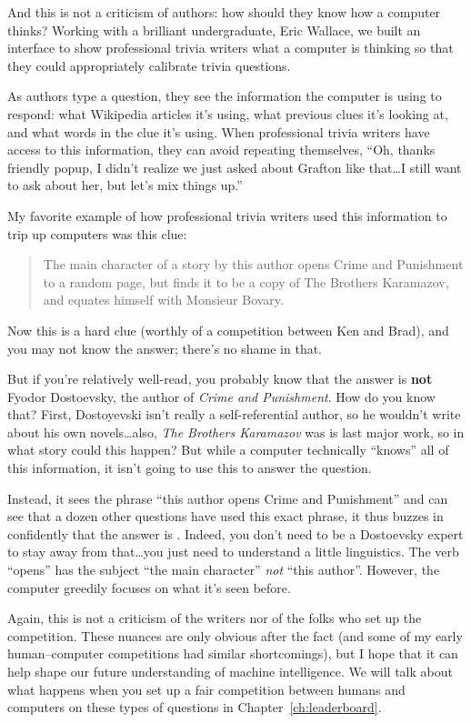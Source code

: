 And this is not a criticism of \jeopardy{} authors: how should they
know how a computer thinks?
%
Working with a brilliant undergraduate, Eric Wallace, we built an
interface to show professional trivia writers what a computer is
thinking so that they could appropriately calibrate trivia questions.

As authors type a question, they see the information the computer is
using to respond:
%
what Wikipedia articles it's using,
%
what previous clues it's looking at,
%
and what words in the clue it's using.
%
When professional trivia writers have access to this information, they can
avoid repeating themselves,
%
``Oh, thanks friendly popup, I didn't realize we just asked about
Grafton like that\dots I still want to ask about her, but let's mix
things up.''

My favorite example of how professional trivia writers used this
information to trip up computers was this clue:
\begin{quote}
  The main character of a story by this author opens Crime and
  Punishment to a random page, but finds it to be a copy of The
  Brothers Karamazov, and equates himself with Monsieur Bovary.
\end{quote}
%
Now this is a hard clue (worthly of a competition between Ken and
Brad), and you may not know the answer; there's no shame in that.

But if you're relatively well-read, you probably know that the answer
is {\bf not} Fyodor Dostoevsky, the author of \textit{Crime and
  Punishment}.
%
How do you know that?  
%
First, Dostoyevski isn't really a self-referential author, so he
wouldn't write about his own novels\dots also, \textit{The Brothers
  Karamazov} was is last major work, so in what story could this
happen?
%
But while a computer technically ``knows'' all of this information, it
isn't going to use this to answer the question.

Instead, it sees the phrase ``this author opens Crime and Punishment''
and can see that a dozen other questions have used this exact phrase,
it thus buzzes in confidently that the answer is .
%
Indeed, you don't need to be a Dostoevsky expert to stay away from
that\dots you just need to understand a little linguistics.
%
The verb ``opens'' has the subject ``the main character'' \emph{not}
``this author''.
%
However, the computer greedily focuses on what it's seen before.

Again, this is not a criticism of the \jeopardy{} writers nor of the
 folks who set up the competition.
%
These nuances are only obvious after the fact (and some of my early
human--computer competitions had similar shortcomings), but I hope
that it can help shape our future understanding of machine
intelligence.
%
We will talk about what happens when you set up a fair competition between
humans and computers on these types of questions in
Chapter~\ref{ch:leaderboard}.


